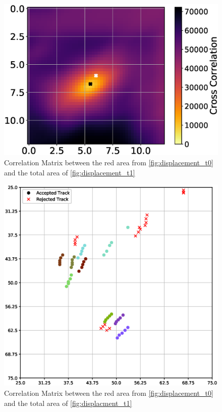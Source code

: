 \documentclass[11pt,twoside,a4paper,fleqn]{report}
\numberwithin{equation}{chapter}
\numberwithin{figure}{chapter}
\numberwithin{table}{chapter}
\begin{document}
\begin{figure}[ht]
	\includegraphics[width=\textwidth,trim={5mm 0 5mm 0},clip]{Correlation_Matrix.eps}
	\caption{Correlation Matrix between the red area from \ref{fig:displacement_t0} and the total area of \ref{fig:displacement_t1}}
	\label{fig:corr_matrix}
\end{figure}

\begin{figure}[ht]
	\includegraphics[width=\textwidth,trim={5mm 0 5mm 0},clip]{displacement.eps}
	\caption{Correlation Matrix between the red area from \ref{fig:displacement_t0} and the total area of \ref{fig:displacment_t1}}
	\label{fig:displacement}
\end{figure}
\end{document}
